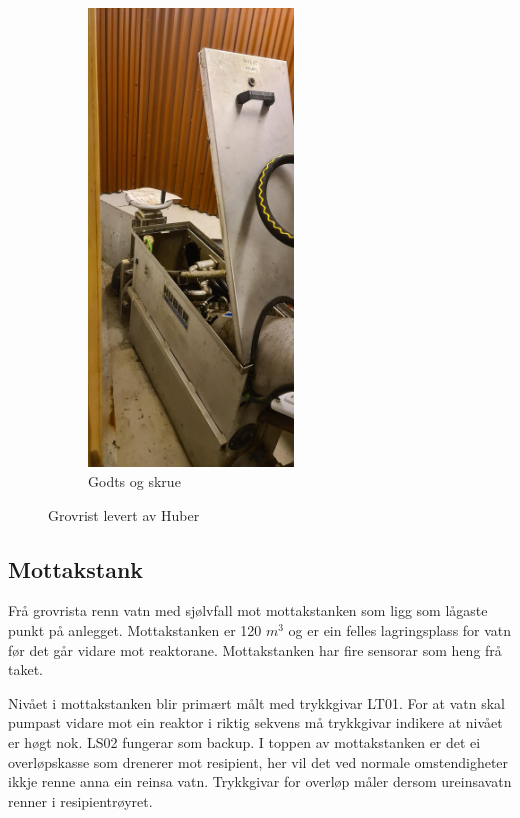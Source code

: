\begin{figure}[htbp]
\begin{subfigure}[b]{0.3\textwidth}
        \includegraphics[angle=-90,width=0.6\textwidth]{Bilder/Huber2.JPG}
        \caption{Godts og skrue}\label{fig:Huber2}
    \end{subfigure}
    \caption{Grovrist levert av Huber}\label{fig:HuberGrovrist}
\end{figure}

\newpage
\subsection{Mottakstank}
Frå grovrista renn vatn med sjølvfall mot mottakstanken som ligg som lågaste punkt på anlegget.
Mottakstanken er 120 $m^3$ og er ein felles lagringsplass for vatn før det går vidare mot reaktorane.
Mottakstanken har fire sensorar som heng frå taket.

Nivået i mottakstanken blir primært målt med trykkgivar LT01. For at vatn skal pumpast vidare mot ein
reaktor i riktig sekvens må trykkgivar indikere at nivået er høgt nok. LS02 fungerar som backup. \newline
I toppen av mottakstanken er det ei overløpskasse som drenerer mot resipient, her vil det
ved normale omstendigheter ikkje renne anna ein reinsa vatn. Trykkgivar for overløp måler
dersom ureinsavatn renner i resipientrøyret.

